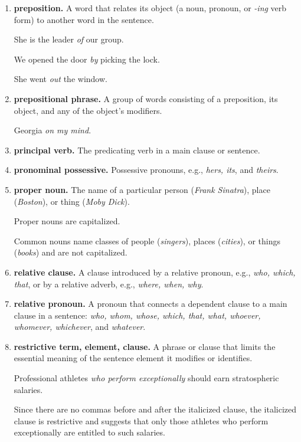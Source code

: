 \documentclass{book}
\numberwithin{equation}{section}
\begin{document}
\begin{enumerate}
    \textit{Birds fly}.
    
    \textit{The partygoers celebrated wildly for a long time}.
    \item \textbf{preposition.} A word that relates its object (a noun, pronoun, or \textit{-ing} verb form) to another word in the sentence.
    
    She is the leader \textit{of} our group.
    
    We opened the door \textit{by} picking the lock.
    
    She went \textit{out} the window.
    \item \textbf{prepositional phrase.} A group of words consisting of a preposition, its object, and any of the object's modifiers.
    
    Georgia \textit{on my mind}.
    \item \textbf{principal verb.} The predicating verb in a main clause or sentence.
    \item \textbf{pronominal possessive.} Possessive pronouns, e.g., \textit{hers, its}, and \textit{theirs}.
    \item \textbf{proper noun.} The name of a particular person (\textit{Frank Sinatra}), place (\textit{Boston}), or thing (\textit{Moby Dick}).
    
    Proper nouns are capitalized.
    
    Common nouns name classes of people (\textit{singers}), places (\textit{cities}), or things (\textit{books}) and are not capitalized.
    \item \textbf{relative clause.} A clause introduced by a relative pronoun, e.g., \textit{who, which, that}, or by a relative adverb, e.g., \textit{where, when, why}.
    \item \textbf{relative pronoun.} A pronoun that connects a dependent clause to a main clause in a sentence: \textit{who, whom, whose, which, that, what, whoever, whomever, whichever}, and \textit{whatever}.
    \item \textbf{restrictive term, element, clause.} A phrase or clause that limits the essential meaning of the sentence element it modifies or identifies.
    
    Professional athletes \textit{who perform exceptionally} should earn stratospheric salaries.
    
    Since there are no commas before and after the italicized clause, the italicized clause is restrictive and suggests that only those athletes who perform exceptionally are entitled to such salaries.
    

\end{enumerate}
\end{document}
